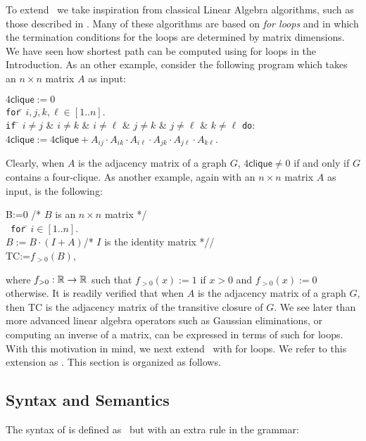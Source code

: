 To extend \lang\ we take inspiration from classical Linear Algebra algorithms, such as those described in \cite{num}. Many of these algorithms are based on \textit{for loops} and in which the termination conditions for the loops are determined by matrix dimensions. We have seen how shortest path can be computed using for loops in the Introduction. As an other example, consider the following program which takes
an $n\times n$ matrix $A$ as input:
\begin{tabbing}
$4\mathsf{clique}:=0$\\
\texttt{for}\=\,  $i,j,k,\ell\in[1..n]$. \\
\> \texttt{if} \= $i\neq j$ \& $i\neq k$ \& $i\neq \ell$ \& $j\neq k$ \& $j\neq \ell$ \& $k\neq\ell$ \texttt{do}:\\
\> \> $4\mathsf{clique}:= 4\mathsf{clique} + A_{ij}\cdot A_{ik}\cdot A_{i\ell} \cdot A_{jk}\cdot A_{j\ell} \cdot A_{k\ell}$.  
\end{tabbing}
Clearly, when $A$ is the adjacency matrix of a graph $G$, $4\mathsf{clique}\neq 0$ if and only if $G$ contains a four-clique. As another example, again with an $n\times n$ matrix $A$ as input, is the following:
\begin{tabbing}
B:=0 \quad /* $B$ is an $n\times n$ matrix */\\\	
\texttt{for}\=\,  $i\in[1..n]$.\\
\> $B:=B\cdot (I+A)$\quad /* $I$ is the identity matrix *//\\
\textsf{TC}:=$f_{>0}(B)$,
\end{tabbing}
where $f_{>0}:\mathbb{R}\to\mathbb{R}$ such that $f_{>0}(x):=1$ if $x>0$ and $f_{>0}(x):=0$ otherwise. It is readily verified that when $A$ is the adjacency matrix of a graph $G$, then \textsf{TC} is the adjacency matrix of the transitive closure of $G$.
We see later than more advanced linear algebra operators such as Gaussian eliminations, or computing an inverse of a matrix, can be expressed in terms of such for loops. With this motivation in mind, we next extend \lang\ with for loops. We refer to this extension as \langfor. This section is organized as follows.


\subsection{Syntax and Semantics}
%
%
%
The syntax of \langfor is defined as \lang\, but with an extra rule in the grammar:
\medskip


